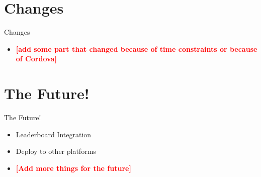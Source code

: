 \documentclass[aspectratio=169]{beamer}
\newcommand{\todo}[1]{\textcolor{red}{\textbf{[#1]}}}
\begin{document}
\section{Changes}

\begin{frame}{Changes}
	\begin{itemize}

		\item \todo{add some part that changed because of time constraints or because of Cordova}

	\end{itemize}
\end{frame}

\section{The Future!}

\begin{frame}{The Future!}
	\begin{itemize}
		
		\item Leaderboard Integration

		\item Deploy to other platforms

		\item \todo{Add more things for the future}

	\end{itemize}
\end{frame}

\end{document}
